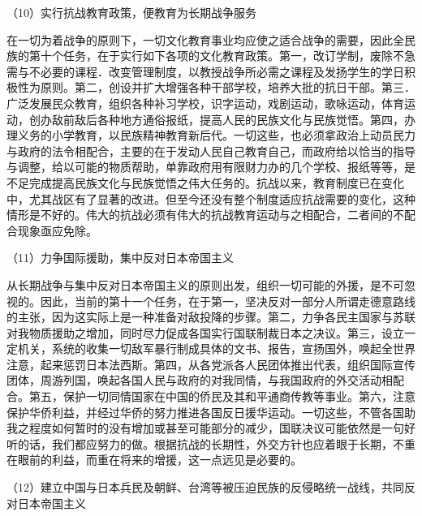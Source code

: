 \documentclass[UTF8, 12pt, a4paper]{ctexrep}
\begin{document}
（10）实行抗战教育政策，便教育为长期战争服务

在一切为着战争的原则下，一切文化教育事业均应使之适合战争的需要，因此全民族的第十个任务，在于实行如下各项的文化教育政策。第一，改订学制，废除不急需与不必要的课程．改变管理制度，以教授战争所必需之课程及发扬学生的学日积极性为原则。第二，创设并扩大增强各种干部学校，培养大批的抗日干部。第三．广泛发展民众教育，组织各种补习学校，识字运动，戏剧运动，歌咏运动，体育运动，创办敌前敌后各种地方通俗报纸，提高人民的民族文化与民族觉悟。第四，办理义务的小学教育，以民族精神教育新后代。一切这些，也必须拿政治上动员民力与政府的法令相配合，主要的在于发动人民自己教育自己，而政府给以恰当的指导与调整，给以可能的物质帮助，单靠政府用有限财力办的几个学校、报纸等等，是不足完成提高民族文化与民族觉悟之伟大任务的。抗战以来，教育制度已在变化中，尤其战区有了显著的改进。但至今还没有整个制度适应抗战需要的变化，这种情形是不好的。伟大的抗战必须有伟大的抗战教育运动与之相配合，二者间的不配合现象亟应免除。

（11）力争国际援助，集中反对日本帝国主义

从长期战争与集中反对日本帝国主义的原则出发，组织一切可能的外援，是不可忽视的。因此，当前的第十一个任务，在于第一，坚决反对一部分人所谓走德意路线的主张，因为这实际上是一种准备对敌投降的步骤。第二，力争各民主国家与苏联对我物质援助之增加，同时尽力促成各国实行国联制裁日本之决议。第三，设立一定机关，系统的收集一切敌军暴行制成具体的文书、报告，宣扬国外，唤起全世界注意，起来惩罚日本法西斯。第四，从各党派各人民团体推出代表，组织国际宣传团体，周游列国，唤起各国人民与政府的对我同情，与我国政府的外交活动相配合。第五，保护一切同情国家在中国的侨民及其和平通商传教等事业。第六，注意保护华侨利益，并经过华侨的努力推进各国反日援华运动。一切这些，不管各国助我之程度如何暂时的没有增加或甚至可能部分的减少，国联决议可能依然是一句好听的话，我们都应努力的做。根据抗战的长期性，外交方针也应着眼于长期，不重在眼前的利益，而重在将来的增援，这一点远见是必要的。

（12）建立中国与日本兵民及朝鲜、台湾等被压迫民族的反侵略统一战线，共同反对日本帝国主义
\end{document}
